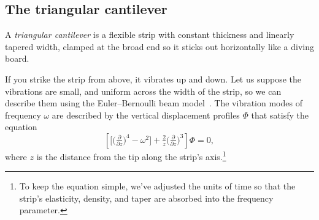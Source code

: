 \documentclass{article}
\theoremstyle{definition}
\theoremstyle{plain}
\begin{document}
\subsection{The triangular cantilever}\label{sec:catilever}
%
A {\em triangular cantilever} is a flexible strip with constant thickness and linearly tapered width, clamped at the broad end so it sticks out horizontally like a diving board.
\begin{center}
\end{center}
If you strike the strip from above, it vibrates up and down. Let us suppose the vibrations are small, and uniform across the width of the strip, so we can describe them using the Euler--Bernoulli beam model~\cite[\S 12.4]{genta2009vibration}. The vibration modes of frequency $\omega$ are described by the vertical displacement profiles $\Phi$ that satisfy the equation
\begin{equation}\label{eqn:triangular_cantilever}
    \left[\big[\big(\tfrac{\partial}{\partial z}\big)^4 - \omega^2\big] + \tfrac{2}{z}\big(\tfrac{\partial}{\partial z}\big)^3\right] \Phi = 0,
\end{equation}
where $z$ is the distance from the tip along the strip's axis.\footnote{To keep the equation simple, we've adjusted the units of time so that the strip's elasticity, density, and taper are absorbed into the frequency parameter.}
\end{document}
